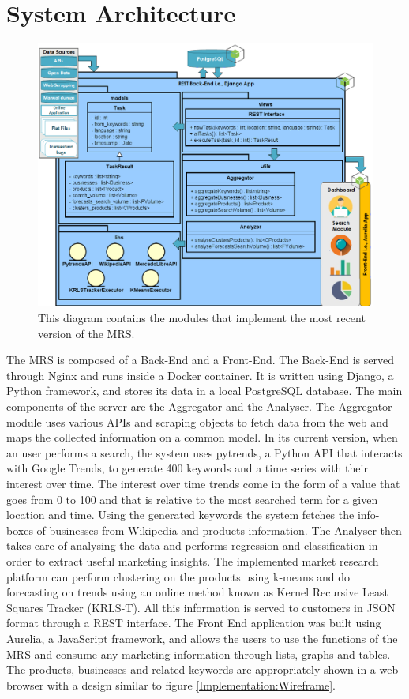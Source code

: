 \section{System Architecture}

\begin{figure}[H]
	\centering
	\includegraphics[scale=0.7]{img/architecture.png}
	\caption{This diagram contains the modules that implement the most recent version of the MRS.}
	\label{Implementation:System Architecture}
\end{figure} 

The \ac{MRS} is composed of a Back-End and a Front-End. The Back-End is served through Nginx and runs inside a Docker container. It is written using Django, a Python framework, and stores its data in a local PostgreSQL database. The main components of the server are the Aggregator and the Analyser. The Aggregator module uses various APIs and scraping objects to fetch data from the web and maps the collected information on a common model. In its current version, when an user performs a search, the system uses pytrends, a Python API that interacts with Google Trends, to generate 400 keywords and a time series with their interest over time. The interest over time trends come in the form of a value that goes from 0 to 100 and that is relative to the most searched term for a given location and time. Using the generated keywords the system fetches the info-boxes of businesses from Wikipedia and products information. The Analyser then takes care of analysing the data and performs regression and classification in order to extract useful marketing insights. The implemented market research platform can perform clustering on the products using k-means and do forecasting on trends using an online method known as Kernel Recursive Least Squares Tracker (KRLS-T). All this information is served to customers in JSON format through a REST interface. The Front End application was built using Aurelia, a JavaScript framework, and allows the users to use the functions of the \ac{MRS} and consume any marketing information through lists, graphs and tables. The products, businesses and related keywords are appropriately shown in a web browser with a design similar to figure \ref{Implementation:Wireframe}.

